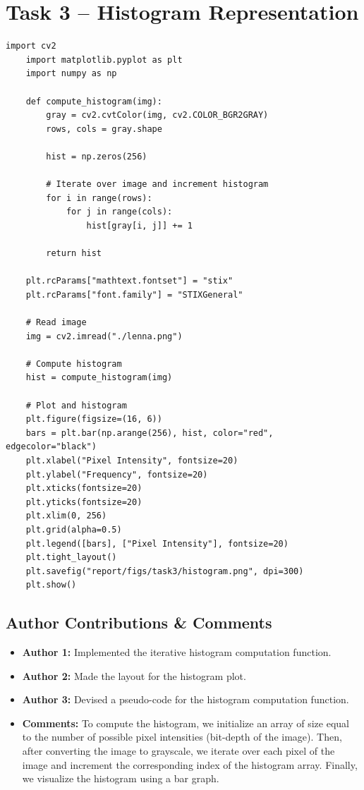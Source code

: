 \documentclass[11pt,a4paper]{article}
\begin{document}
\newpage
\section{Task 3 -- Histogram Representation}

\begin{lstlisting}[language=iPython, title=Python Code for Histogram Representation]
    import cv2
    import matplotlib.pyplot as plt
    import numpy as np
    
    def compute_histogram(img):
        gray = cv2.cvtColor(img, cv2.COLOR_BGR2GRAY)
        rows, cols = gray.shape
    
        hist = np.zeros(256)
    
        # Iterate over image and increment histogram
        for i in range(rows):
            for j in range(cols):
                hist[gray[i, j]] += 1
    
        return hist
    
    plt.rcParams["mathtext.fontset"] = "stix"
    plt.rcParams["font.family"] = "STIXGeneral"
    
    # Read image
    img = cv2.imread("./lenna.png")
    
    # Compute histogram
    hist = compute_histogram(img)
    
    # Plot and histogram
    plt.figure(figsize=(16, 6))
    bars = plt.bar(np.arange(256), hist, color="red", edgecolor="black")
    plt.xlabel("Pixel Intensity", fontsize=20)
    plt.ylabel("Frequency", fontsize=20)
    plt.xticks(fontsize=20)
    plt.yticks(fontsize=20)
    plt.xlim(0, 256)
    plt.grid(alpha=0.5)
    plt.legend([bars], ["Pixel Intensity"], fontsize=20)
    plt.tight_layout()
    plt.savefig("report/figs/task3/histogram.png", dpi=300)
    plt.show()
\end{lstlisting}

\subsection*{Author Contributions \& Comments}
\begin{itemize}[itemsep=-1ex, topsep=0pt, leftmargin=1em]
    \color{RoyalBlue}\item \textbf{Author 1:} \color{black}{--} Implemented the iterative histogram computation function.
          \color{RoyalBlue}\item \textbf{Author 2:} \color{black}{--} Made the layout for the histogram plot.
          \color{RoyalBlue}\item \textbf{Author 3:} \color{black}{--} Devised a pseudo-code for the histogram computation function.
    \item \textbf{Comments:} To compute the histogram, we initialize an array of size equal to the number of possible pixel intensities (bit-depth of the image). Then, after converting the image to grayscale, we iterate over each pixel of the image and increment the corresponding index of the histogram array. Finally, we visualize the histogram using a bar graph.
\end{itemize}
\end{document}
